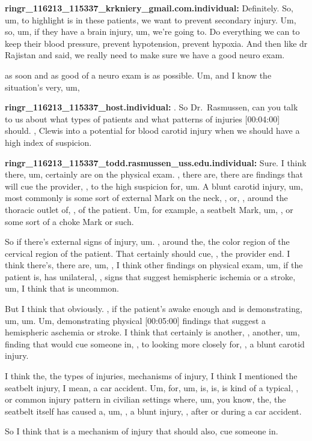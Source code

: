 \documentclass[
]{book}
\begin{document}
\textbf{ringr\_116213\_115337\_krkniery\_gmail.com.individual:} Definitely. So,
um, to highlight is in these patients, we want to prevent secondary
injury. Um, so, um, if they have a brain injury, um, we're going to. Do
everything we can to keep their blood pressure, prevent hypotension,
prevent hypoxia. And then like dr Rajistan and said, we really need to
make sure we have a good neuro exam.

as soon and as good of a neuro exam is as possible. Um, and I know the
situation's very, um,

\textbf{ringr\_116213\_115337\_host.individual:} . So Dr.~Rasmussen, can you
talk to us about what types of patients and what patterns of injuries
{[}00:04:00{]} should. , Clewis into a potential for blood carotid injury
when we should have a high index of suspicion.

\textbf{ringr\_116213\_115337\_todd.rasmussen\_uss.edu.individual:} Sure. I think
there, um, certainly are on the physical exam. , there are, there are
findings that will cue the provider, , to the high suspicion for, um. A
blunt carotid injury, um, most commonly is some sort of external Mark on
the neck, , or, , around the thoracic outlet of, , of the patient. Um,
for example, a seatbelt Mark, um, , or some sort of a choke Mark or
such.

So if there's external signs of injury, um. , around the, the color
region of the cervical region of the patient. That certainly should cue,
, the provider end. I think there's, there are, um, , I think other
findings on physical exam, um, if the patient is, has unilateral, ,
signs that suggest hemispheric ischemia or a stroke, um, I think that is
uncommon.

But I think that obviously. , if the patient's awake enough and is
demonstrating, um, um. Um, demonstrating physical {[}00:05:00{]} findings
that suggest a hemispheric aschemia or stroke. I think that certainly is
another, , another, um, finding that would cue someone in, , to looking
more closely for, , a blunt carotid injury.

I think the, the types of injuries, mechanisms of injury, I think I
mentioned the seatbelt injury, I mean, a car accident. Um, for, um, is,
is, is kind of a typical, , or common injury pattern in civilian
settings where, um, you know, the, the seatbelt itself has caused a, um,
, a blunt injury, , after or during a car accident.

So I think that is a mechanism of injury that should also, cue someone
in.
\end{document}
